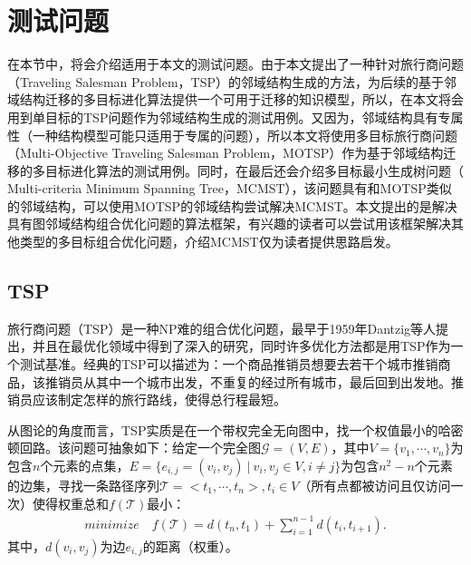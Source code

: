 \section{测试问题}
\label{sec:背景介绍:测试问题}
在本节中，将会介绍适用于本文的测试问题。由于本文提出了一种针对旅行商问题（Traveling Salesman Problem，TSP）的邻域结构生成的方法，为后续的基于邻域结构迁移的多目标进化算法提供一个可用于迁移的知识模型，所以，在本文将会用到单目标的TSP问题作为邻域结构生成的测试用例。又因为，邻域结构具有专属性（一种结构模型可能只适用于专属的问题），所以本文将使用多目标旅行商问题（Multi-Objective Traveling Salesman Problem，MOTSP）作为基于邻域结构迁移的多目标进化算法的测试用例。同时，在最后还会介绍多目标最小生成树问题（ Multi-criteria Minimum Spanning Tree，MCMST），该问题具有和MOTSP类似的邻域结构，可以使用MOTSP的邻域结构尝试解决MCMST。本文提出的是解决具有图邻域结构组合优化问题的算法框架，有兴趣的读者可以尝试用该框架解决其他类型的多目标组合优化问题，介绍MCMST仅为读者提供思路启发。

\subsection{TSP}
\label{subsec:背景介绍:测试问题:TSP}
旅行商问题（TSP）是一种NP难的组合优化问题\cite{johnson1990traveling,baraglia2001hybrid,johnson2007experimental}，最早于1959年Dantzig等人提出，并且在最优化领域中得到了深入的研究，同时许多优化方法都是用TSP作为一个测试基准。经典的TSP可以描述为：一个商品推销员想要去若干个城市推销商品，该推销员从其中一个城市出发，不重复的经过所有城市，最后回到出发地。推销员应该制定怎样的旅行路线，使得总行程最短。
\par
从图论的角度而言，TSP实质是在一个带权完全无向图中，找一个权值最小的哈密顿回路。该问题可抽象如下：给定一个完全图$\mathcal{G}=(V,E)$，其中$V = \{ v_1, \cdots, v_n \}$为包含$n$个元素的点集，$E = \{ e_{i,j} = (v_i,v_j) \ | \ v_i,v_j \in V, i \not = j \}$为包含$n^2-n$个元素的边集，寻找一条路径序列$\mathcal{T} = <t_1, \cdots, t_n>, t_i \in V $（所有点都被访问且仅访问一次）使得权重总和$f(\mathcal{T})$最小：
\begin{align}
    \label{eq:TSP}
    minimize \quad f(\mathcal{T}) = d(t_n,t_1) + \sum_{i=1}^{n-1} d(t_i,t_{i+1}).
\end{align}
其中，$d(v_i, v_j)$为边$e_{i,j}$的距离（权重）。

